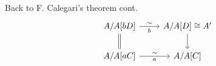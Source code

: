 \documentclass{beamer}
\begin{document}
\begin{frame}[fragile]{Back to F. Calegari's theorem cont.}
    \[
        \begin{tikzcd}
            A/A[bD]
            \arrow[r, "\sim", "b"']
            \ar[equal]{d}
            &
            A/A[D]\cong A'
            \ar[d]
            \\
            A/A[a C]
            \arrow[r, "\sim", "a"']
            &
            A/A[C]
        \end{tikzcd}
    \]
\end{frame}
\end{document}
